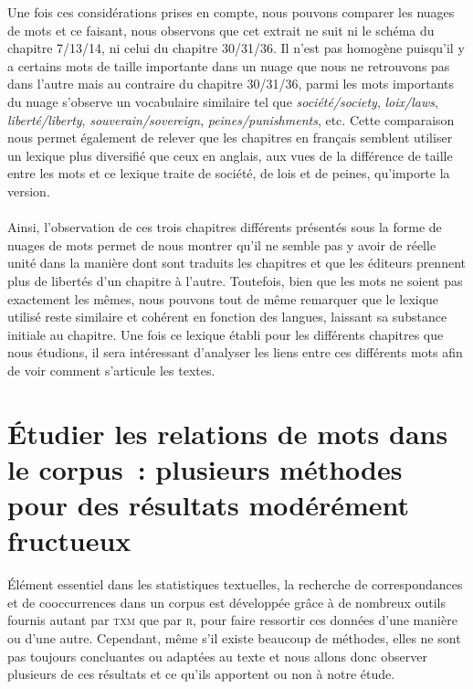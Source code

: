 Une fois ces considérations prises en compte, nous pouvons comparer les nuages de mots et ce faisant, nous observons que cet extrait ne suit ni le schéma du chapitre 7/13/14, ni celui du chapitre 30/31/36. Il n'est pas homogène puisqu'il y a certains mots de taille importante dans un nuage que nous ne retrouvons pas dans l'autre mais au contraire du chapitre 30/31/36, parmi les mots importants du nuage s'observe un vocabulaire similaire tel que \textit{société/society}, \textit{loix/laws}, \textit{liberté/liberty}, \textit{souverain/sovereign}, \textit{peines/punishments}, etc. Cette comparaison nous permet également de relever que les chapitres en français semblent utiliser un lexique plus diversifié que ceux en anglais, aux vues de la différence de taille entre les mots et ce lexique traite de société, de lois et de peines, qu'importe la version.

\paragraph{}Ainsi, l'observation de ces trois chapitres différents présentés sous la forme de nuages de mots permet de nous montrer qu'il ne semble pas y avoir de réelle unité dans la manière dont sont traduits les chapitres et que les éditeurs prennent plus de libertés d'un chapitre à l'autre. Toutefois, bien que les mots ne soient pas exactement les mêmes, nous pouvons tout de même remarquer que le lexique utilisé reste similaire et cohérent en fonction des langues, laissant sa substance initiale au chapitre. Une fois ce lexique établi pour les différents chapitres que nous étudions, il sera intéressant d'analyser les liens entre ces différents mots afin de voir comment s'articule les textes.

\section{Étudier les relations de mots dans le corpus~: plusieurs méthodes pour des résultats modérément fructueux}
Élément essentiel dans les statistiques textuelles, la recherche de correspondances et de cooccurrences dans un corpus est développée grâce à de nombreux outils fournis autant par \textsc{txm} que par \textsc{r}, pour faire ressortir ces données d'une manière ou d'une autre. Cependant, même s'il existe beaucoup de méthodes, elles ne sont pas toujours concluantes ou adaptées au texte et nous allons donc observer plusieurs de ces résultats et ce qu'ils apportent ou non à notre étude.

